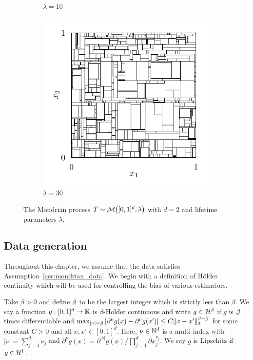 \begin{figure}[t]
\begin{subfigure}{0.32\textwidth}
    \caption{$\lambda = 10$}
  \end{subfigure}
  \begin{subfigure}{0.32\textwidth}
    \centering
    \includegraphics[scale=0.64]{graphics/plot_mondrian_process_3.pdf}
    \caption{$\lambda = 30$}
  \end{subfigure}
  \caption[The Mondrian process]{
    The Mondrian process $T \sim \mathcal{M} \big( [0,1]^d, \lambda \big)$ with
  $d=2$ and lifetime parameters $\lambda$.}
  \label{fig:mondrian_process}
\end{figure}

\subsection{Data generation}

Throughout this chapter, we assume that the data satisfies
Assumption~\ref{ass:mondrian_data}. We begin with a definition of H{\"o}lder
continuity which will be used for controlling the bias of various estimators.

\begin{definition}%

  Take $\beta > 0$ and define $\flbeta$ to be the largest integer which is
  strictly less than $\beta$. We say a function $g: [0,1]^d \to \mathbb{R}$ is
  $\beta$-H{\"o}lder continuous and write $g \in \mathcal{H}^\beta$ if $g$ is $\flbeta$
  times differentiable and
  $\max_{|\nu| = \flbeta}
  \left| \partial^\nu g(x) - \partial^{\nu} g(x') \right|
  \leq C \|x-x'\|_2^{\beta - \flbeta}$
  for some constant $C > 0$ and all $x, x' \in [0,1]^d$. Here, $\nu \in \mathbb{N}^d$
  is a multi-index with $|\nu| = \sum_{j=1}^d \nu_j$ and
  $\partial^{\nu} g(x) = \partial^{|\nu|} g(x) \big/
  \prod_{j=1}^d \partial x_j^{\nu_j}$. We say $g$ is Lipschitz if $g \in \mathcal{H}^1$.

\end{definition}


